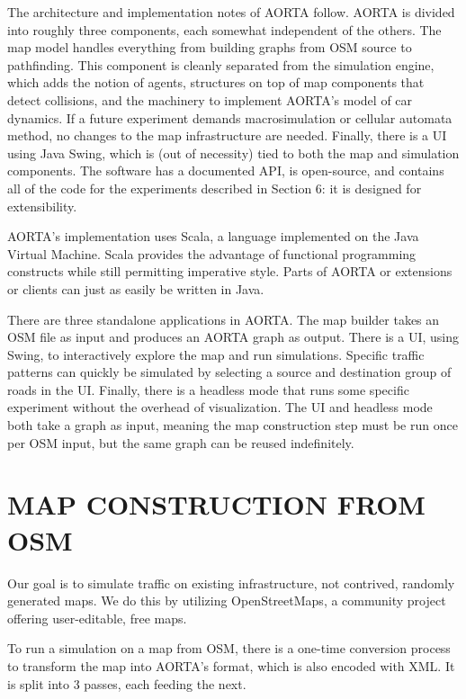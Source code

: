 \documentclass[letterpaper, 10 pt, conference]{ieeeconf}  %
\begin{document}
The architecture and implementation notes of AORTA follow. AORTA is divided into
roughly three components, each somewhat independent of the others. The map model
handles everything from building graphs from OSM source to pathfinding. This
component is cleanly separated from the simulation engine, which adds the notion
of agents, structures on top of map components that detect collisions, and the
machinery to implement AORTA's model of car dynamics. If a future experiment
demands macrosimulation or cellular automata method, no changes to the map
infrastructure are needed. Finally, there is a UI using Java Swing, which is
(out of necessity) tied to both the map and simulation components. The software
has a documented API, is open-source, and contains all of the code for the
experiments described in Section 6: it is designed for extensibility.

AORTA's implementation uses Scala, a language implemented on the Java Virtual
Machine. Scala provides the advantage of functional programming constructs while
still permitting imperative style. Parts of AORTA or extensions or clients can
just as easily be written in Java.

There are three standalone applications in AORTA. The map builder takes an OSM
file as input and produces an AORTA graph as output. There is a UI, using Swing,
to interactively explore the map and run simulations. Specific traffic patterns
can quickly be simulated by selecting a source and destination group of roads in
the UI. Finally, there is a headless mode that runs some specific experiment
without the overhead of visualization. The UI and headless mode both take a
graph as input, meaning the map construction step must be run once per OSM
input, but the same graph can be reused indefinitely.


\section{MAP CONSTRUCTION FROM OSM}

Our goal is to simulate traffic on existing infrastructure, not contrived,
randomly generated maps. We do this by utilizing OpenStreetMaps, a community
project offering user-editable, free maps. 

To run a simulation on a map from OSM, there is a one-time conversion process to
transform the map into AORTA's format, which is also encoded with XML. It is
split into 3 passes, each feeding the next.
\end{document}
